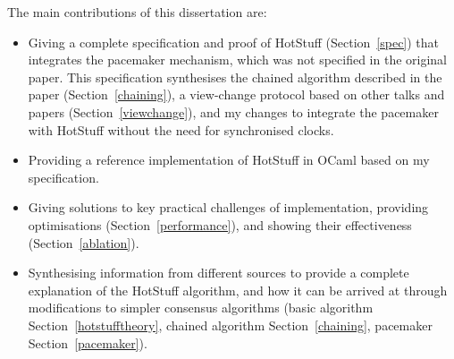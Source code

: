 The main contributions of this dissertation are:
\begin{itemize}
	\item Giving a complete specification and proof of HotStuff (Section~\ref{spec}) that integrates the pacemaker mechanism, which was not specified in the original paper. This specification synthesises the chained algorithm described in the paper (Section~\ref{chaining}), a view-change protocol based on other talks and papers (Section~\ref{viewchange}), and my changes to integrate the pacemaker with HotStuff without the need for synchronised clocks.
	\item Providing a reference implementation of HotStuff in OCaml based on my specification.
	\item Giving solutions to key practical challenges of implementation, providing optimisations (Section~\ref{performance}), and showing their effectiveness (Section~\ref{ablation}).
	\item Synthesising information from different sources to provide a complete explanation of the HotStuff algorithm, and how it can be arrived at through modifications to simpler consensus algorithms (basic algorithm Section~\ref{hotstufftheory}, chained algorithm Section~\ref{chaining}, pacemaker Section~\ref{pacemaker}).
\end{itemize}